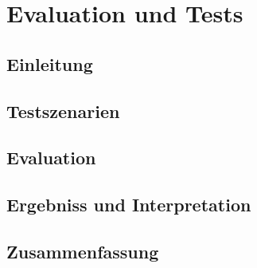 \section{Evaluation und Tests}
\subsection{Einleitung}

\subsection{Testszenarien}

\subsection{Evaluation}

\subsection{Ergebniss und Interpretation}

\subsection{Zusammenfassung}